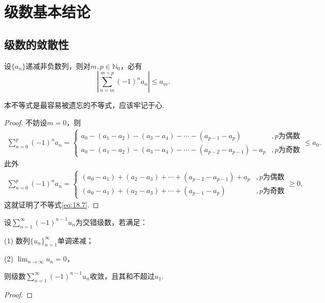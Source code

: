 \documentclass[../../main.tex]{subfiles}%
\begin{document}
\section{级数基本结论}

\subsection{级数的敛散性}

\begin{theorem}[交错级数不等式]\label{theorem:交错级数不等式}
设\(\{a_n\}\)递减非负数列，则对\(m,p\in \mathbb{N}_0\)，必有
\begin{equation}\label{eq:18.7}
\left|\sum_{n = m}^{m + p} (-1)^n a_n\right| \leqslant a_m.
\end{equation}
\end{theorem}
\begin{note}
本不等式是最容易被遗忘的不等式，应该牢记于心.
\end{note}
\begin{proof}
不妨设\(m = 0\)，则
\begin{align*}
\sum_{n = 0}^{p} (-1)^n a_n = 
\begin{cases}
a_0 - (a_1 - a_2) - (a_3 - a_4) - \cdots - (a_{p - 1} - a_p) &, p\text{为偶数} \\
a_0 - (a_1 - a_2) - (a_3 - a_4) - \cdots - (a_{p - 2} - a_{p - 1}) - a_p &, p\text{为奇数}
\end{cases}
\leqslant a_0.
\end{align*}
此外
\begin{align*}
\sum_{n = 0}^{p} (-1)^n a_n = 
\begin{cases}
(a_0 - a_1) + (a_2 - a_3) + \cdots + (a_{p - 2} - a_{p - 1}) + a_p &, p\text{为偶数} \\
(a_0 - a_1) + (a_2 - a_3) + \cdots + (a_{p - 1} - a_p) &, p\text{为奇数}
\end{cases}
\geqslant 0,
\end{align*}
这就证明了不等式\eqref{eq:18.7}.
\end{proof}

\begin{theorem}[Leibniz判别法]\label{theorem:Leibniz(莱布尼兹)判别法}
设$\sum_{n=1}^{\infty} (-1)^{n - 1} u_n$为交错级数，若满足：

(1) 数列$\{u_n\}_{n=1}^{\infty}$单调递减；

(2) $\lim_{n \to \infty} u_n = 0$，

则级数$\sum_{n=1}^{\infty} (-1)^{n - 1} u_n$收敛，且其和不超过$u_1$.
\end{theorem}
\begin{proof}

\end{proof}
\end{document}
